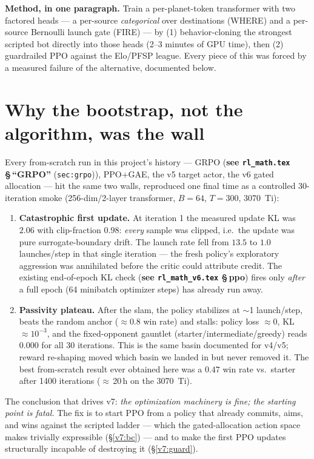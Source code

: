 \documentclass[11pt]{article}
\newcommand{\rlref}[2]{\textbf{see \texttt{rl\_math.tex} \S\,``#1''} (\texttt{#2})}
\newcommand{\vsixref}[1]{\textbf{see \texttt{rl\_math\_v6.tex} \S\,#1}}
\begin{document}
\noindent\textbf{Method, in one paragraph.} Train a per-planet-token transformer with two factored
heads --- a per-source \emph{categorical} over destinations (WHERE) and a per-source Bernoulli
launch gate (FIRE) --- by (1) behavior-cloning the strongest scripted bot directly into those heads
(2--3 minutes of GPU time), then (2) guardrailed PPO against the Elo/PFSP league. Every piece of
this was forced by a measured failure of the alternative, documented below.

\section{Why the bootstrap, not the algorithm, was the wall}\label{v7:why}

Every from-scratch run in this project's history --- GRPO (\rlref{GRPO}{sec:grpo}), PPO+GAE, the v5
target actor, the v6 gated allocation --- hit the same two walls, reproduced one final time as a
controlled 30-iteration smoke (256-dim/2-layer transformer, $B{=}64$, $T{=}300$, 3070~Ti):

\begin{enumerate}[leftmargin=2em]
\item \textbf{Catastrophic first update.} At iteration 1 the measured update KL was $2.06$ with
clip-fraction $0.98$: \emph{every} sample was clipped, i.e.\ the update was pure surrogate-boundary
drift. The launch rate fell from $13.5$ to $1.0$ launches/step in that single iteration --- the
fresh policy's exploratory aggression was annihilated before the critic could attribute credit. The
existing end-of-epoch KL check (\vsixref{ppo}) fires only \emph{after} a full epoch (64 minibatch
optimizer steps) has already run away.
\item \textbf{Passivity plateau.} After the slam, the policy stabilizes at $\sim$1 launch/step,
beats the random anchor ($\approx 0.8$ win rate) and stalls: policy loss $\approx 0$, KL
$\approx 10^{-3}$, and the fixed-opponent gauntlet (starter/intermediate/greedy) reads $0.000$ for
all 30 iterations. This is the same basin documented for v4/v5; reward re-shaping moved which basin
we landed in but never removed it. The best from-scratch result ever obtained here was a $0.47$
win rate vs.\ starter after 1400 iterations ($\approx$\,20\,h on the 3070~Ti).
\end{enumerate}

The conclusion that drives v7: \emph{the optimization machinery is fine; the starting point is
fatal.} The fix is to start PPO from a policy that already commits, aims, and wins against the
scripted ladder --- which the gated-allocation action space makes trivially expressible
(\S\ref{v7:bc}) --- and to make the first PPO updates structurally incapable of destroying it
(\S\ref{v7:guard}).
\end{document}

